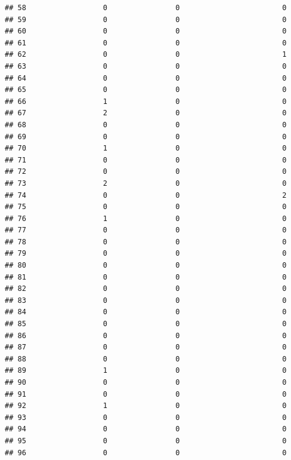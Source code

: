 \documentclass[
]{article}
\begin{document}
\begin{verbatim}
## 58                  0                0                        0
## 59                  0                0                        0
## 60                  0                0                        0
## 61                  0                0                        0
## 62                  0                0                        1
## 63                  0                0                        0
## 64                  0                0                        0
## 65                  0                0                        0
## 66                  1                0                        0
## 67                  2                0                        0
## 68                  0                0                        0
## 69                  0                0                        0
## 70                  1                0                        0
## 71                  0                0                        0
## 72                  0                0                        0
## 73                  2                0                        0
## 74                  0                0                        2
## 75                  0                0                        0
## 76                  1                0                        0
## 77                  0                0                        0
## 78                  0                0                        0
## 79                  0                0                        0
## 80                  0                0                        0
## 81                  0                0                        0
## 82                  0                0                        0
## 83                  0                0                        0
## 84                  0                0                        0
## 85                  0                0                        0
## 86                  0                0                        0
## 87                  0                0                        0
## 88                  0                0                        0
## 89                  1                0                        0
## 90                  0                0                        0
## 91                  0                0                        0
## 92                  1                0                        0
## 93                  0                0                        0
## 94                  0                0                        0
## 95                  0                0                        0
## 96                  0                0                        0

\end{verbatim}
\end{document}
